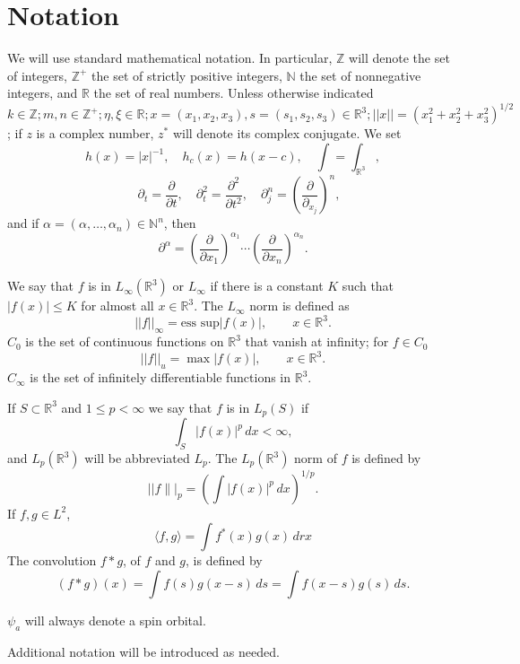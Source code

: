 \documentclass[english, reqno]{amsart}
\newcommand{\del}{\mbox{$\partial$}}
\newcommand{\IR}{\text{${\mathbb{R}}$}}
\newcommand{\IZ}{\text{${\mathbb{Z}}$}}
\newcommand{\IN}{\text{${\mathbb{N}}$}}
\begin{document}
\section{Notation} \label{section 2}
We will use standard mathematical notation. In particular, 
$\IZ$ will denote the set of integers, $\IZ^+$ the set of strictly positive integers, $\IN$ the set of nonnegative integers, and $\IR$ the set of real numbers. 
Unless otherwise indicated $k \in \IZ; m,n \in \IZ^+; \eta, \xi \in \IR;  x=(x_1,x_2,x_3), s=(s_1,s_2,s_3) \in \IR^3;
||x||=(x_1^2+x_2^2+x_3^2)^{1/2}$;  if $z$ is a complex number, $z^{\ast}$ will denote its complex conjugate. We set
\[ 
h(x)=|x|^{-1}, \quad h_c(x)=h(x-c), \quad \int = \int_{\IR^3},
\]
\[
\quad\del_t=\frac{\del}{\del t}, \quad \del^2_t=\frac{\del^2}{\del t^2},  \quad \del^n_j= \left (\frac{\del}{\del_{x_j}} \right )^n,
\]
and if $\alpha=(\alpha, \dots, \alpha_n)\in \IN^n$, then 
\[
 \del^{\alpha}= \left(\frac{\del}{\del x_1} \right)^{\alpha_1} \cdots \left(\frac{\del}{\del x_n} \right)^{\alpha_n}.
\]

We say that $f$ is in $L_{\infty}(\IR^3)$ or $L_{\infty}$ if there is a constant $K$ such that
$|f(x)| \le K$ for almost all $x \in \IR^3$. The $L_{\infty}$ norm is defined as
\[
||f||_{\infty} = \text{ess sup}|f(x)|, \qquad x \in \IR^3.
\]
$C_0$ is the set of continuous functions on $\IR^3$ that vanish at infinity; for $f \in C_0$
\[
||f||_u=\max |f(x)|,  \qquad x \in \IR^3.
\]
$C_{\infty}$ is the set of infinitely differentiable functions in $\IR^3$.

If $S \subset  \IR^3$ and $1 \le p <\infty$ we say that $f$ is in $L_p(S)$ if
\[
\int_S |f(x)|^p\,dx < \infty,
\]
and  $L_p(\IR^3)$ will be abbreviated $L_p$. The
$L_p(\IR^3)$ norm of $f$ is defined by
\[
||f\||_p =\left (\int |f(x)|^p \, dx\right )^{1/p}.
\]
If $f,g \in L^2$,
\[
\langle f,g \rangle = \int f^{\ast}(x) g(x)\, drx
\]
The convolution $f\ast g$, of $f$ and $g$, is defined by
\[
(f\ast g)(x)=\int f(s) g(x-s)\, ds =\int f(x-s) g(s)\, ds.
\]

$\psi_a$ will always denote a spin orbital.

Additional notation will be introduced as needed.
\end{document}
